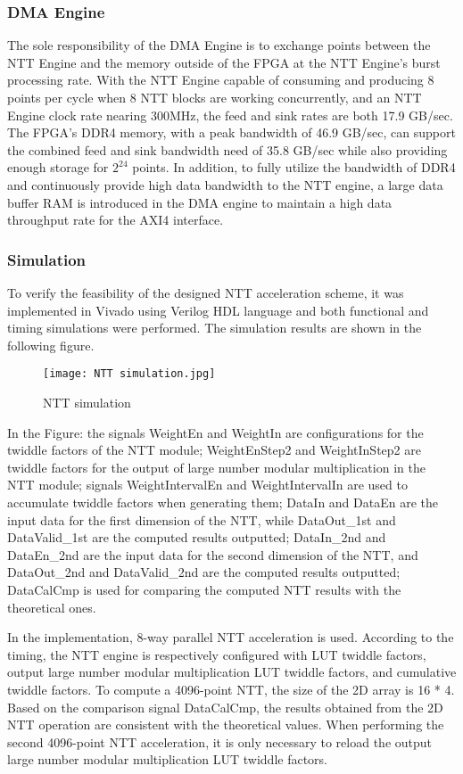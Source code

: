 \subsubsection{DMA Engine}

The sole responsibility of the DMA Engine is to exchange points between the NTT Engine and the memory outside of the FPGA at the NTT Engine's burst processing rate. With the NTT Engine capable of consuming and producing 8 points per cycle when 8 NTT blocks are working concurrently, and an NTT Engine clock rate nearing 300MHz, the feed and sink rates are both 17.9 GB/sec. The FPGA's DDR4 memory, with a peak bandwidth of 46.9 GB/sec, can support the combined feed and sink bandwidth need of 35.8 GB/sec while also providing enough storage for $2^{24}$ points.
  In addition, to fully utilize the bandwidth of DDR4 and continuously provide high data bandwidth to the NTT engine, a large data buffer RAM is introduced in the DMA engine to maintain a high data throughput rate for the AXI4 interface.

\subsubsection{Simulation}

To verify the feasibility of the designed NTT acceleration scheme, it was implemented in Vivado using Verilog HDL language and both functional and timing simulations were performed. The simulation results are shown in the following figure.

\begin{figure}[h]
  \centering
  \texttt{[image: NTT simulation.jpg]}
  \caption{NTT simulation}
  \label{fig:NTT_Simu}
\end{figure}

In the Figure: the signals WeightEn and WeightIn are configurations for the twiddle factors of the NTT module; WeightEnStep2 and WeightInStep2 are twiddle factors for the output of large number modular multiplication in the NTT module; signals WeightIntervalEn and WeightIntervalIn are used to accumulate twiddle factors when generating them; DataIn and DataEn are the input data for the first dimension of the NTT, while DataOut\_1st and DataValid\_1st are the computed results outputted; DataIn\_2nd and DataEn\_2nd are the input data for the second dimension of the NTT, and DataOut\_2nd and DataValid\_2nd are the computed results outputted; DataCalCmp is used for comparing the computed NTT results with the theoretical ones.

In the implementation, 8-way parallel NTT acceleration is used. According to the timing, the NTT engine is respectively configured with LUT twiddle factors, output large number modular multiplication LUT twiddle factors, and cumulative twiddle factors. To compute a 4096-point NTT, the size of the 2D array is 16 * 4. Based on the comparison signal DataCalCmp, the results obtained from the 2D NTT operation are consistent with the theoretical values. When performing the second 4096-point NTT acceleration, it is only necessary to reload the output large number modular multiplication LUT twiddle factors.
